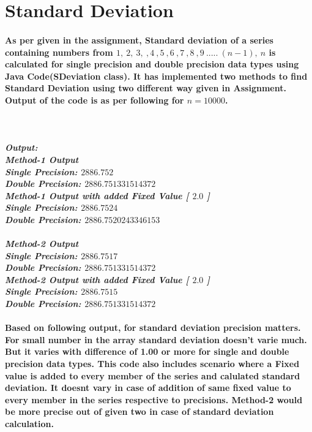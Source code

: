 \documentclass[12pt]{article}
\begin{document}
\section{Standard Deviation}
\paragraph{
As per given in the assignment, Standard deviation of a series containing numbers from $1, \ 2, \ 3, \ ,4 \ ,5 \ ,6 \ ,7 \ ,8 \ ,9 \ ..... \ (n-1), \ n$ is calculated for single precision and double precision data types using Java Code(SDeviation class). It has implemented two methods to find Standard Deviation using two different way given in Assignment. Output of the code is as per following for $n=10000$.
}
\textbf{\textit{\\ \\Output:\\
Method-1 Output \\
Single Precision: $2886.752$ \\
Double Precision: $2886.751331514372$ \\
Method-1 Output with added Fixed Value [ $2.0$ ] \\
Single Precision: $2886.7524$ \\
Double Precision: $2886.7520243346153$ \\
\\
Method-2 Output \\
Single Precision: $2886.7517$  \\
Double Precision: $2886.751331514372$ \\
Method-2 Output with added Fixed Value [ $2.0$ ] \\
Single Precision: $2886.7515$ \\
Double Precision: $2886.751331514372$ \\}}

\paragraph{ Based on following output, for standard deviation precision matters. For small number in the array standard deviation doesn't varie much. But it varies with difference of 1.00 or more for single and double precision data types. This code also includes scenario where a Fixed value is added to every member of the series and calulated standard deviation. It doesnt vary in case of addition of same fixed value to every member in the series respective to precisions. Method-2 would be more precise out of given two in case of standard deviation calculation.}
\end{document}

